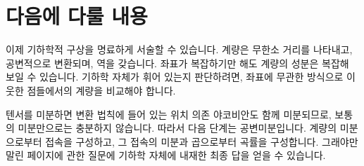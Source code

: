 \begin{classroomqa}
\end{classroomqa}

\section{다음에 다룰 내용}

이제 기하학적 구상을 명료하게 서술할 수 있습니다. 계량은 무한소 거리를 나타내고, 공변적으로 변환되며, 역을 갖습니다. 좌표가 복잡하기만 해도 계량의 성분은 복잡해 보일 수 있습니다. 기하학 자체가 휘어 있는지 판단하려면, 좌표에 무관한 방식으로 이웃한 점들에서의 계량을 비교해야 합니다.

텐서를 미분하면 변환 법칙에 들어 있는 위치 의존 야코비안도 함께 미분되므로, 보통의 미분만으로는 충분하지 않습니다. 따라서 다음 단계는 공변미분입니다. 계량의 미분으로부터 접속을 구성하고, 그 접속의 미분과 곱으로부터 곡률을 구성합니다. 그래야만 말린 페이지에 관한 질문에 기하학 자체에 내재한 최종 답을 얻을 수 있습니다.
